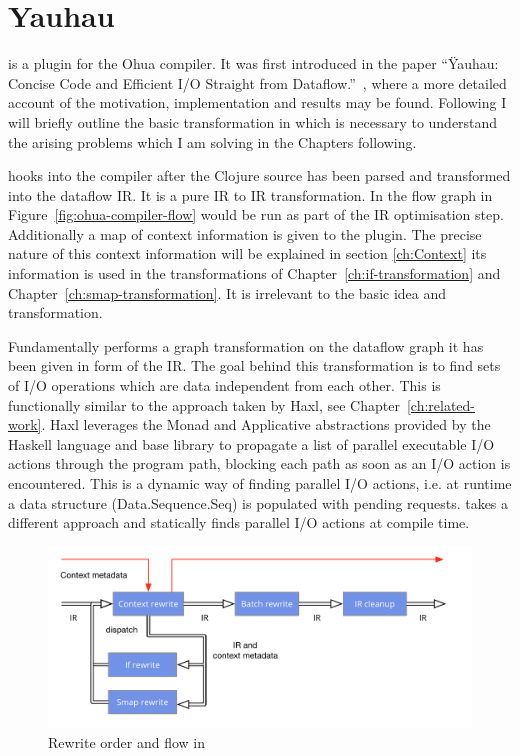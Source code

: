 \chapter{Yauhau}

\label{ch:Yauhau}

\yauhau{} is a plugin for the Ohua compiler.
It was first introduced in the paper ``Ÿauhau: Concise Code and Efficient I/O Straight from Dataflow.''~\cite{ErtelGoensAdamEtAl2016}, where a more detailed account of the motivation, implementation and results may be found.
Following I will briefly outline the basic transformation in \yauhau{} which is necessary to understand the arising problems which I am solving in the Chapters following.

\yauhau{} hooks into the compiler after the Clojure source has been parsed and transformed into the dataflow IR.
It is a pure IR to IR transformation.
In the flow graph in Figure~\ref{fig:ohua-compiler-flow} \yauhau{} would be run as part of the IR optimisation step.
Additionally a map of context information is given to the plugin.
The precise nature of this context information will be explained in section \ref{ch:Context} its information is used in the transformations of Chapter~\ref{ch:if-transformation} and Chapter~\ref{ch:smap-transformation}.
It is irrelevant to the basic \yauhau{} idea and transformation.

Fundamentally \yauhau{} performs a graph transformation on the dataflow graph it has been given in form of the IR.
The goal behind this transformation is to find sets of I/O operations which are data independent from each other.
This is functionally similar to the approach taken by Haxl\cite{Haxl:library:link}, see Chapter~\ref{ch:related-work}.
Haxl leverages the Monad and Applicative abstractions provided by the Haskell language and base library to propagate a list of parallel executable I/O actions through the program path, blocking each path as soon as an I/O action is encountered.
This is a dynamic way of finding parallel I/O actions, i.e. at runtime a data structure (Data.Sequence.Seq) is populated with pending requests.
\yauhau{} takes a different approach and statically finds parallel I/O actions at compile time.

\begin{figure}
    \includegraphics[width=\textwidth]{../Figures/yauhau-rewrite-flow}
    \caption{Rewrite order and flow in \yauhau{}}
    \label{fig:yauhau-rewrite-flow}
\end{figure}

